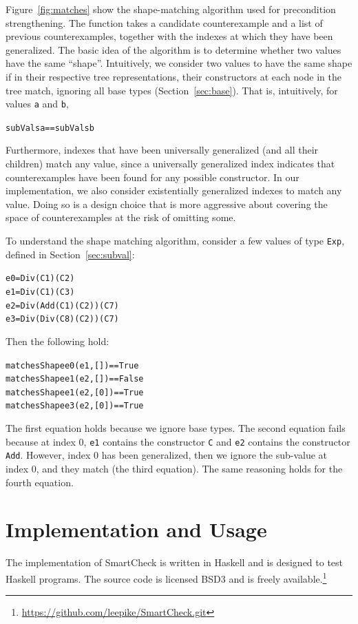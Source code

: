 \documentclass{sigplanconf}
\newenvironment{code}{\begin{alltt}}{\end{alltt}}
\newcommand{\ttp}[1]{\texttt{#1}}
\begin{document}
Figure~\ref{fig:matches} show the shape-matching algorithm used for precondition
strengthening.  The function takes a candidate counterexample and a list of
previous counterexamples, together with the indexes at which they have been
generalized.  The basic idea of the algorithm is to determine whether two values
have the same ``shape''.  Intuitively, we consider two values to have the same
shape if in their respective tree representations, their constructors at each
node in the tree match, ignoring all base types (Section~\ref{sec:base}).
That is, intuitively, for values \ttp{a} and \ttp{b},
%
\begin{code}
subVals a == subVals b
\end{code}
%
\noindent
Furthermore, indexes that have been universally generalized (and all their
children) match any value, since a universally generalized index indicates that
counterexamples have been found for any possible constructor.  In our
implementation, we also consider existentially generalized indexes to match any
value.  Doing so is a design choice that is more aggressive about covering the
space of counterexamples at the risk of omitting some.

To understand the shape matching algorithm, consider a few values of type
\ttp{Exp}, defined in Section~\ref{sec:subval}:
%
\begin{code}
e0 = Div (C 1) (C 2)
e1 = Div (C 1) (C 3)
e2 = Div (Add (C 1) (C 2)) (C 7)
e3 = Div (Div (C 8) (C 2)) (C 7)
\end{code}
%
\noindent
Then the following hold:
%
\begin{code}
matchesShape e0 (e1, [])  == True
matchesShape e1 (e2, [])  == False
matchesShape e1 (e2, [0]) == True
matchesShape e3 (e2, [0]) == True
\end{code}
%
The first equation holds because we ignore base types.  The second equation
fails because at index 0, \ttp{e1} contains the constructor \ttp{C} and \ttp{e2}
contains the constructor \ttp{Add}.  However, index 0 has been generalized, then
we ignore the sub-value at index 0, and they match (the third equation).
The same reasoning holds for the fourth equation.


\section{Implementation and Usage}\label{sec:implementation}

The implementation of SmartCheck is written in Haskell and is designed to test
Haskell programs.  The source code is licensed BSD3 and is freely
available.\footnote{\url{https://github.com/leepike/SmartCheck.git}}
\end{document}
